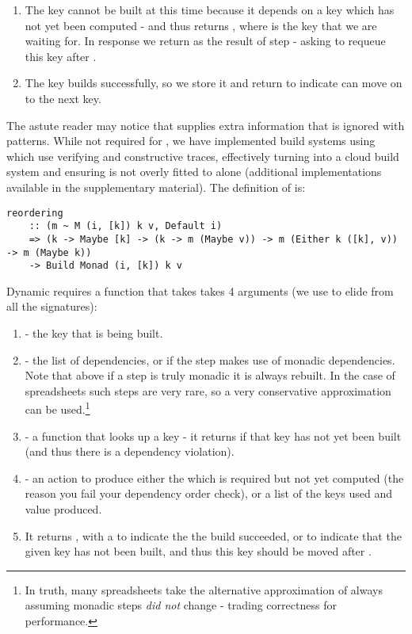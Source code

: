 \begin{enumerate}
\item The key cannot be built at this time because it depends on a key which has not yet been computed - and thus  returns , where  is the key that we are waiting for. In response we return  as the result of step - asking  to requeue this key after .
\item The key builds successfully, so we store it and return  to indicate  can move on to the next key.
\end{enumerate}

The astute reader may notice that  supplies extra information that is ignored with \hs{_} patterns. While not required for \Excel, we have implemented build systems using  which use verifying and constructive traces, effectively turning \Excel into a cloud build system and ensuring  is not overly fitted to \Excel alone (additional implementations available in the supplementary material). The definition of  is:

\begin{verbatim}
reordering
    :: (m ~ M (i, [k]) k v, Default i)
    => (k -> Maybe [k] -> (k -> m (Maybe v)) -> m (Either k ([k], v)) -> m (Maybe k))
    -> Build Monad (i, [k]) k v
\end{verbatim}

Dynamic requires a function that takes takes 4 arguments (we use  to elide  from all the signatures):

\begin{enumerate}
\item {} - the key that is being built.
\item {} - the list of dependencies, or  if the step makes use of monadic dependencies. Note that above if a step is truly monadic it is always rebuilt. In the case of spreadsheets such steps are very rare, so a very conservative approximation can be used.\footnote{In truth, many spreadsheets take the alternative approximation of always assuming monadic steps \textit{did not} change - trading correctness for performance.}
\item {} - a function that looks up a key - it returns  if that key has not yet been built (and thus there is a dependency violation).
\item {} - an action to produce either the  which is required but not yet computed (the reason you fail your dependency order check), or a list of the keys used and value produced.
\item It returns , with a  to indicate the the build succeeded, or  to indicate that the given key  has not been built, and thus this key should be moved after .
\end{enumerate}

